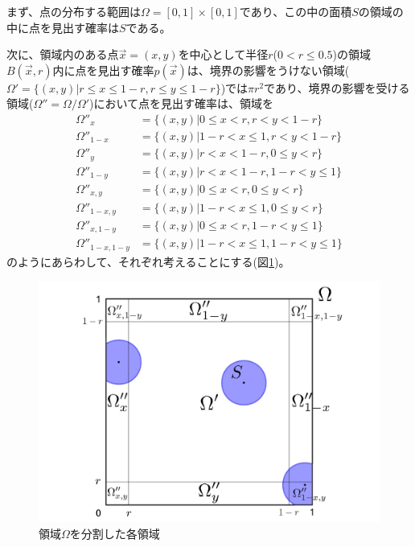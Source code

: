 まず、点の分布する範囲は$\Omega = [0,1]\times [0,1]$であり、この中の面積$S$の領域の中に点を見出す確率は$S$である。

次に、領域内のある点$\vec x=(x,y)$を中心として半径$r$($0 < r \le 0.5$)の領域$B(\vec x, r)$内に点を見出す確率$p(\vec x)$は、境界の影響をうけない領域($\Omega ' = \{(x,y) | r \le x \le 1-r, r \le y \le 1-r \}$)では$\pi r^{2}$であり、境界の影響を受ける領域($\Omega'' = \Omega / \Omega'$)において点を見出す確率は、領域を
\begin{align}
\Omega''_{x} &= \{(x,y) | 0 \le x < r, r< y < 1-r\}\nonumber \\
\Omega''_{1-x} &= \{(x,y) | 1-r < x \le 1, r< y < 1-r\}\nonumber \\
\Omega''_{y} &= \{(x,y) | r < x < 1-r, 0 \le y < r\}\nonumber \\
\Omega''_{1-y} &= \{(x,y) | r < x < 1-r, 1-r < y \le 1\}\nonumber \\
\Omega''_{x,y} &= \{(x,y) | 0 \le x < r, 0 \le y < r\}\nonumber \\
\Omega''_{1-x,y} &= \{(x,y) | 1-r < x \le 1, 0 \le y < r\}\nonumber \\
\Omega''_{x,1-y} &= \{(x,y) | 0 \le x < r, 1-r < y \le 1\}\nonumber \\
\Omega''_{1-x, 1-y} &= \{(x,y) | 1-r < x \le 1, 1-r < y \le 1\}\nonumber
\end{align}
のようにあらわして、それぞれ考えることにする(図\ref{fig:f20})。
\begin{figure}[H]
    \begin{center}
        \includegraphics[width=12.5cm]{../img/omega.jpg}
        \caption{領域$\Omega$を分割した各領域}
        \label{fig:f20}
    \end{center}
\end{figure}
